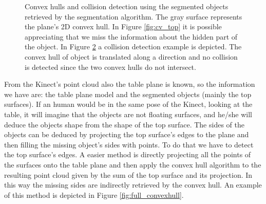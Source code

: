 \begin{figure}[h]
\begin{subfigure}[t]{0.3\textwidth}
\caption{}\label{fig:cv_top_collision}
\end{subfigure}
\caption{Convex hulls and collision detection using the segmented objects retrieved by the  segmentation algorithm. The gray surface represents the plane's 2D convex hull. In Figure \ref{fig:cv_top} it is possible appreciating that we miss the information about the hidden part of the object. In Figure \ref{fig:cv_top_collision} a collision detection example is depicted. The convex hull of object  is translated along a direction and no collision is detected  since the two convex hulls do not intersect.}
\end{figure}

From the Kinect's point cloud also the table plane is known, so the information we have are: the table plane model and the segmented objects (mainly the top surfaces).
If an human would be in the same pose of the Kinect, looking at the table, it will imagine that the objects are not floating surfaces, and he/she will deduce the objects shape from the shape of the top surface. The sides of the objects can be deduced by projecting the top surface's edges to the plane and then filling the missing object's sides with points. To do that we have to detect the top surface's edges. A easier method is directly projecting all the points of the surfaces onto the table plane and then apply the convex hull algorithm to the resulting point cloud given by the sum of the top surface and its projection. In this way the missing sides are indirectly retrieved by the convex hull. An example of this method is depicted in Figure \ref{fig:full_convexhull}.


